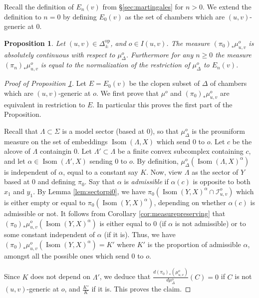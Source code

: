 \documentclass[a4paper, 11pt]{article}
\theoremstyle{plain}
\newtheorem{proposition}{Proposition}[section]
\theoremstyle{definition}
\theoremstyle{remark}
\DeclareMathOperator{\Isom}{Isom}
\newcommand{\op}{\mathrm{op}}
\newcommand{\IR}{\mathcal I}
\begin{document}
Recall the definition of $E_n(v)$ from \S\ref{sec:martingales} for $n>0$. We extend the definition to $n=0$ by defining $E_0(v)$ as the set of chambers which are $(u,v)$-generic at $0$.

\begin{proposition}\label{prop:pinac}
Let $(u,v)\in \Delta_\pm^\op$, and $o\in I(u,v)$.
The measure $(\pi_0)_*\mu_{u,v}^o$ is absolutely continuous with respect to $\mu_\Delta^o$. 
Furthermore 
for any $n\geq 0$ the measure $(\pi_n)_*\mu_{u,v}^o$ is equal to the normalization of the restriction of $\mu_\Delta^o$ to $E_n(v)$.
\end{proposition}




\begin{proof}[Proof of Proposition \ref{prop:pinac}]

Let $E=E_0(v)$ be the clopen subset of $\Delta$ of chambers which are $(u,v)$-generic at $o$. We first prove that $\mu^o$ and $(\pi_0)_*\mu_{u,v}^o$ are equivalent in restriction to $E$. In particular this proves the first part of the Proposition.

Recall that $\Lambda\subset\Sigma$ is a model sector (based at $0$), so that $\mu^o_\Delta$ is the prouniform measure on the set of embeddings $\Isom(\Lambda,X)$ which send $0$ to $o$. Let $c$ be the alcove of $\Lambda$ containgin $0$. Let $\Lambda'\subset \Lambda$ be a finite convex subcomplex containing $c$, and let $\alpha\in \Isom(\Lambda',X)$ sending $0$ to $o$. By definition, $\mu_\Delta^o(\Isom(\Lambda,X)^\alpha)$ is independent of $\alpha$, equal to a constant say $K$.  Now, view $\Lambda$ as the sector of $Y$ based at $0$ and defining $\pi_0$. Say that $\alpha$ is \emph{admissible} if $\alpha(c)$ is opposite to both $x_1$ and $y_1$.
By Lemma \ref{lem:sectorpi0}, we have $\pi_0(\Isom(Y,X)^\alpha\cap \IR_{u,v}^o)$ which is either empty or equal to $\pi_0(\Isom(Y,X)^\alpha)$, depending on whether $\alpha(c)$ is admissible or not. It follows from Corollary \ref{cor:measurepreserving}
  that $(\pi_0)_*\mu_{u,v}^o (\Isom(Y,X)^\alpha)$ is either equal to $0$ (if $\alpha$ is not admissible) or to some constant independent of $\alpha$ (if it is). Thus, we have 
  $(\pi_0)_*\mu_{u,v}^o (\Isom(Y,X)^\alpha)= K'$ where $K'$ is the proportion of admissible $\alpha$, amongst all the possible ones which send $0$ to $o$.

Since $K$ does not depend on $\Lambda'$, we deduce that $\frac{d(\pi_0)_*(\mu_{u,v}^o)}{d\mu^o_\Delta}(C) = 0$ if $C$ is not $(u,v)$-generic at $o$, and $\frac {K'}K$ if it is. This proves the claim.




\end{proof}
\end{document}

